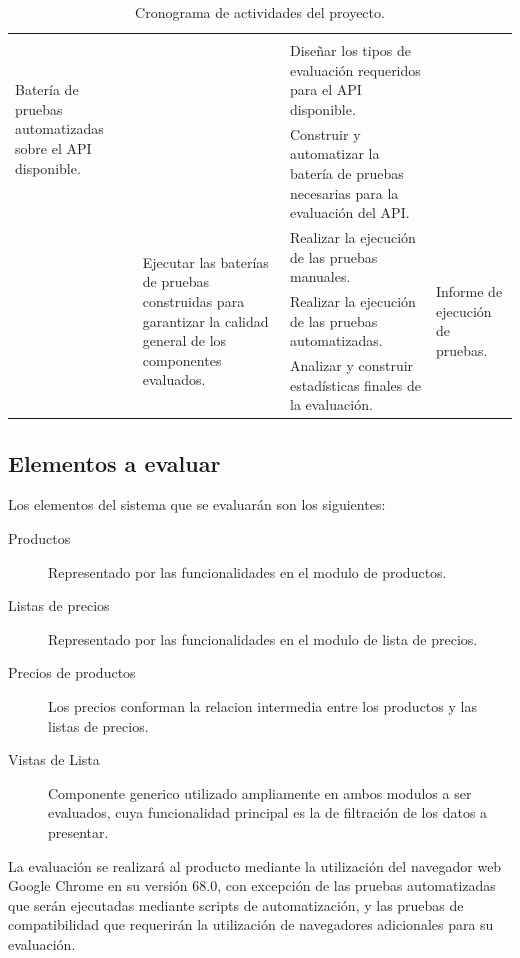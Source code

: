 \begin{table}
\begin{tabular}{|l|l|p{6.5cm}|l|}
\multirow{3}{4.0cm}{Batería de pruebas automatizadas sobre el API disponible.} \\
\cline{3-3}
& & Diseñar los tipos de evaluación requeridos para el API disponible. & \\
\cline{3-3}
& & Construir y automatizar la batería de pruebas necesarias para la evaluación del API. & \\
\cline{2-4}
& \multirow{3}{4.0cm}{Ejecutar las baterías de pruebas construidas para garantizar la calidad general de los componentes evaluados.} &
Realizar la ejecución de las pruebas manuales. &
\multirow{3}{4.0cm}{Informe de ejecución de pruebas.} \\
\cline{3-3}
& & Realizar la ejecución de las pruebas automatizadas. & \\
\cline{3-3}
& & Analizar y construir estadísticas finales de la evaluación. & \\
\hline
\end{tabular}
\caption{Cronograma de actividades del proyecto.}
\label{cronograma}
\end{table}

\subsection{Elementos a evaluar}
Los elementos del sistema que se evaluarán son los siguientes:

\begin{description}
\item [Productos] Representado por las funcionalidades en el modulo de productos.
\item [Listas de precios] Representado por las funcionalidades en el modulo de
    lista de precios.
\item [Precios de productos] Los precios conforman la relacion intermedia entre
    los productos y las listas de precios.
\item [Vistas de Lista] Componente generico utilizado ampliamente en ambos
    modulos a ser evaluados, cuya funcionalidad principal es la de filtración de
    los datos a presentar.
\end{description}

La evaluación se realizará al producto mediante la utilización del navegador
web Google Chrome en su versión 68.0, con excepción de las pruebas automatizadas
que serán ejecutadas mediante scripts de automatización, y las pruebas de
compatibilidad que requerirán la utilización de navegadores adicionales para su
evaluación.

